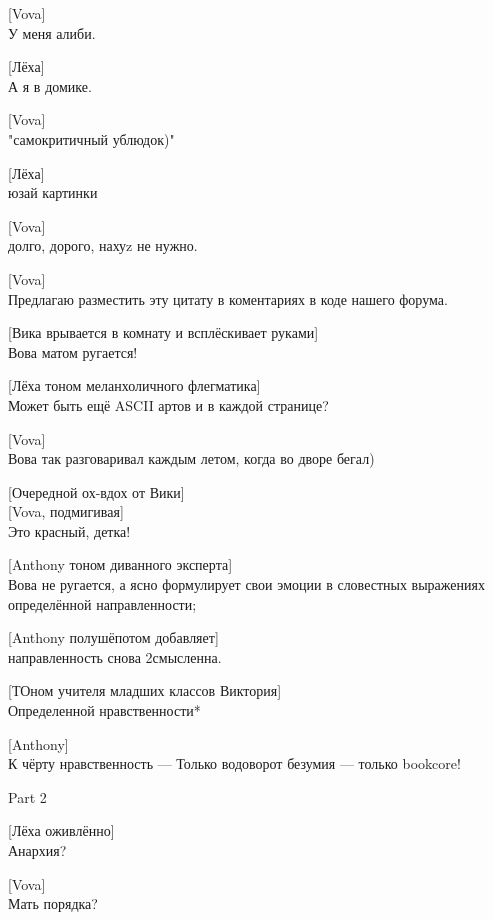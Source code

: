 [Vova]\\
У меня алиби.


[Лёха]\\
А я в домике.


[Vova]\\
"самокритичный ублюдок)"



[Лёха]\\
юзай картинки


[Vova]\\
долго, дорого, нахуz не нужно.


[Vova]\\
Предлагаю разместить эту цитату в коментариях в коде нашего форума.


[Вика врывается в комнату и всплёскивает руками]\\
Вова матом ругается!


[Лёха тоном меланхоличного флегматика]\\
Может быть ещё ASCII артов и в каждой странице?


[Vova]\\
Вова так разговаривал каждым летом, когда во дворе бегал)


[Очередной ох-вдох от Вики]\\


[Vova, подмигивая]\\
Это красный, детка!


[Anthony тоном диванного эксперта]\\
Вова не ругается, а ясно формулирует свои эмоции в словестных выражениях определённой направленности;


[Anthony полушёпотом добавляет]\\
направленность снова 2смысленна.


[ТОном учителя младших классов Виктория]\\
Определенной нравственности*


[Anthony]\\
К чёрту нравственность --- Только водоворот безумия --- только bookcore!


\begin{center}
\large Part 2
\end{center}


{\small{}}


[Лёха оживлённо]\\
Анархия?


[Vova]\\
Мать порядка?


